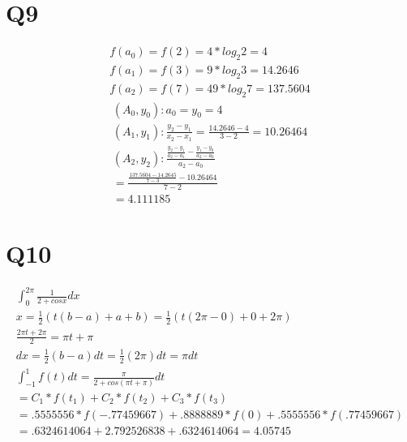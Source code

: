 \documentclass[11pt]{article} %
\begin{document}
\section{Q9}
\begin{equation}
\begin{split}
f(a_0) = f(2) = 4*log_2 2 = 4\\
f(a_1) = f(3) = 9*log_2 3 = 14.2646\\
f(a_2)= f(7) = 49*log_2 7 = 137.5604
\end{split}
\end{equation}
\begin{equation}
\begin{split}
(A_0,y_0) : a_0 = y_0 = 4 \\
(A_1,y_1) : \frac{y_2-y_1}{x_2-x_1} = \frac{14.2646-4}{3-2} = 10.26464 \\
(A_2,y_2): \frac{\frac{y_2-y_1}{a_2-a_1} - \frac{y_1-y_0}{a_2-a_0}}{a_2-a_0} \\
= \frac{\frac{137.5604-14.2645}{7-3} - 10.26464}{7-2} \\
= 4.111185
\end{split}
\end{equation}
\section{Q10}
\begin{equation}
\begin{split}
\int_{0}^{2\pi}\frac{1}{2+cos x}dx\\
x =\frac{1}{2}(t(b-a)+a+b) = \frac{1}{2}(t(2\pi-0)+0+2\pi)\\
\frac{2\pi t+2\pi}{2} = \pi t + \pi \\
dx = \frac{1}{2}(b-a)dt = \frac{1}{2}(2\pi)dt = \pi dt \\
\int_{-1}^{1}f(t)dt = \frac{\pi}{2+cos(\pi t+\pi)}dt \\
= C_1*f(t_1) + C_2*f(t_2)+C_3*f(t_3) \\ = 
.5555556*f(-.77459667) + .8888889*f(0) + .5555556*f(.77459667)\\
= .6324614064 + 2.792526838 + .6324614064 = 4.05745
\end{split}
\end{equation}
\end{document}
